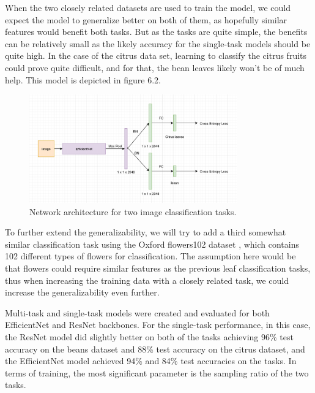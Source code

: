 When the two closely related datasets are used to train the model, we could expect the model to generalize better on both of them, as hopefully similar features would benefit both tasks.
But as the tasks are quite simple, the benefits can be relatively small as the likely accuracy for the single-task models should be quite high.
In the case of the citrus data set, learning to classify the citrus fruits could prove quite difficult, and for that, the bean leaves likely won't be of much help.
This model is depicted in figure 6.2.

\begin{figure}[h!] 
\centering 
\includegraphics[width=0.8\textwidth]{imgs/object_classification_architecture.png}
\caption{Network architecture for two image classification tasks.}
\end{figure}

To further extend the generalizability, we will try to add a third somewhat similar classification task using the Oxford flowers102 dataset \citep{flowers102}, which contains 102 different types of flowers for classification. 
The assumption here would be that flowers could require similar features as the previous leaf classification tasks, thus when increasing the training data with a closely related task, we could increase the generalizability even further.

Multi-task and single-task models were created and evaluated for both EfficientNet and ResNet backbones.
For the single-task performance, in this case, the ResNet model did slightly better on both of the tasks achieving 96\% test accuracy on the beans dataset and 88\% test accuracy on the citrus dataset, and the EfficientNet model achieved 94\% and 84\% test accuracies on the tasks.
In terms of training, the most significant parameter is the sampling ratio of the two tasks.

